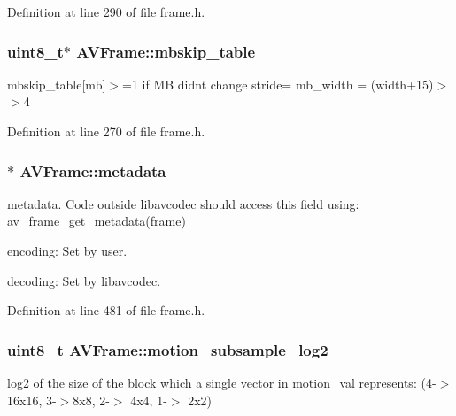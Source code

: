 Definition at line 290 of file frame.\+h.

\subsubsection[{\texorpdfstring{mbskip\+\_\+table}{mbskip_table}}]{ {\bf uint8\+\_\+t}$\ast$ A\+V\+Frame\+::mbskip\+\_\+table}\hypertarget{struct_a_v_frame_a67f603768399357bb742e945118066fd}{}\label{struct_a_v_frame_a67f603768399357bb742e945118066fd}
mbskip\+\_\+table\mbox{[}mb\mbox{]}$>$=1 if MB didn\textquotesingle{}t change stride= mb\+\_\+width = (width+15)$>$$>$4 

Definition at line 270 of file frame.\+h.

\subsubsection[{\texorpdfstring{metadata}{metadata}}]{$\ast$ A\+V\+Frame\+::metadata}\hypertarget{struct_a_v_frame_a5bde87fd101f66d6263bb451056dba13}{}\label{struct_a_v_frame_a5bde87fd101f66d6263bb451056dba13}
metadata. Code outside libavcodec should access this field using\+: av\+\_\+frame\+\_\+get\+\_\+metadata(frame)
\begin{DoxyItemize}
\item encoding\+: Set by user.
\item decoding\+: Set by libavcodec. 
\end{DoxyItemize}

Definition at line 481 of file frame.\+h.

\subsubsection[{\texorpdfstring{motion\+\_\+subsample\+\_\+log2}{motion_subsample_log2}}]{ {\bf uint8\+\_\+t} A\+V\+Frame\+::motion\+\_\+subsample\+\_\+log2}\hypertarget{struct_a_v_frame_abfc1b1ee5cf3c8a85650296e1f8a9bca}{}\label{struct_a_v_frame_abfc1b1ee5cf3c8a85650296e1f8a9bca}
log2 of the size of the block which a single vector in motion\+\_\+val represents\+: (4-\/$>$16x16, 3-\/$>$8x8, 2-\/$>$ 4x4, 1-\/$>$ 2x2) 

